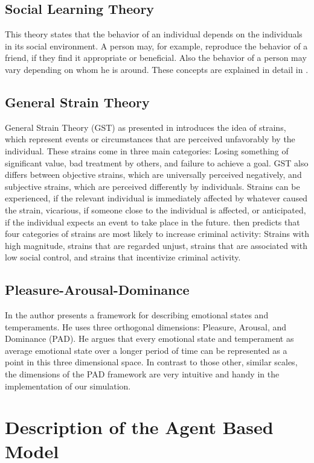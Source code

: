 \documentclass{JASSS}
\begin{document}
\subsection{Social Learning Theory}
This theory states that the behavior of an individual depends on the individuals in its social
environment. A person may, for example, reproduce the behavior of  a friend, if they find it
appropriate or beneficial. Also the behavior of a person may vary depending on whom he is around.
These concepts are explained in detail in \citet{sociallearning}.

\subsection{General Strain Theory}
General Strain Theory (GST) as presented in \citet{generalstrain} introduces the idea of strains, which
represent events or circumstances that are perceived unfavorably by the individual. These strains
come in three main categories: Losing something of significant value, bad treatment by others,
and failure to achieve a goal. GST also differs between objective strains, which are universally
perceived negatively, and subjective strains, which are perceived differently by individuals.
Strains can be experienced, if the relevant individual is immediately affected by whatever caused
the strain, vicarious, if someone close to the individual is affected, or anticipated, if the
individual expects an event to take place in the future. \citet{generalstrain} then predicts that
four categories of strains are most likely to increase criminal activity: Strains with high
magnitude, strains that are regarded unjust, strains that are associated with low social control,
and strains that incentivize criminal activity.

\subsection{Pleasure-Arousal-Dominance}
In \citet{PAD} the author presents a framework for describing emotional states and temperaments.
He uses three orthogonal dimensions: Pleasure, Arousal, and Dominance (PAD). He argues that every
emotional state and temperament as average emotional state over a longer period of time can be
represented as a point in this three dimensional space. In contrast to those other, similar scales,
the dimensions of the PAD framework are very intuitive and handy in the implementation of our
simulation.

\section{Description of the Agent Based Model}
\end{document}
